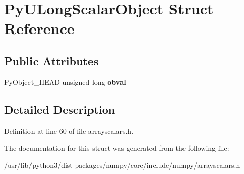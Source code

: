 \hypertarget{structPyULongScalarObject}{}\section{Py\+U\+Long\+Scalar\+Object Struct Reference}
\label{structPyULongScalarObject}
\subsection*{Public Attributes}
\begin{DoxyCompactItemize}
\item 
Py\+Object\+\_\+\+H\+E\+AD unsigned long {\bfseries obval}\hypertarget{structPyULongScalarObject_a65b062c9b4c186a154cde4a4de96d1e5}{}\label{structPyULongScalarObject_a65b062c9b4c186a154cde4a4de96d1e5}

\end{DoxyCompactItemize}


\subsection{Detailed Description}


Definition at line 60 of file arrayscalars.\+h.



The documentation for this struct was generated from the following file\+:\begin{DoxyCompactItemize}
\item 
/usr/lib/python3/dist-\/packages/numpy/core/include/numpy/arrayscalars.\+h\end{DoxyCompactItemize}
